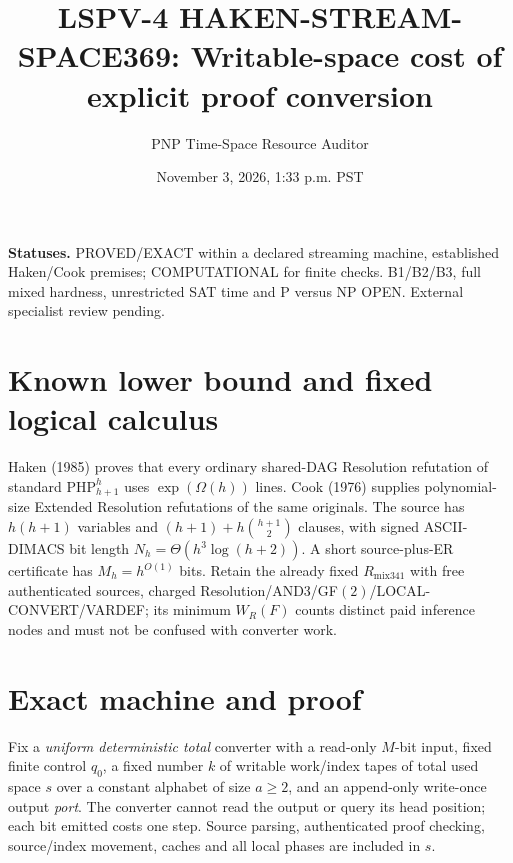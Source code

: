 \documentclass[11pt]{article}
\title{LSPV-4 HAKEN-STREAM-SPACE369: Writable-space cost of explicit proof conversion}
\author{PNP Time-Space Resource Auditor}
\date{November 3, 2026, 1:33 p.m. PST}
\begin{document}
\maketitle
\noindent\textbf{Statuses.} PROVED/EXACT within a declared streaming machine, established Haken/Cook premises; COMPUTATIONAL for finite checks. B1/B2/B3, full mixed hardness, unrestricted SAT time and P versus NP OPEN. External specialist review pending.

\section*{Known lower bound and fixed logical calculus}
Haken (1985) proves that every ordinary shared-DAG Resolution refutation of standard $\mathrm{PHP}_{h+1}^{h}$ uses $\exp(\Omega(h))$ lines. Cook (1976) supplies polynomial-size Extended Resolution refutations of the same originals. The source has $h(h+1)$ variables and $(h+1)+h\binom{h+1}{2}$ clauses, with signed ASCII-DIMACS bit length $N_h=\Theta(h^3\log(h+2))$. A short source-plus-ER certificate has $M_h=h^{O(1)}$ bits. Retain the already fixed $R_{\mathrm{mix341}}$ with free authenticated sources, charged Resolution/AND3/GF$(2)$/LOCAL-CONVERT/VARDEF; its minimum $W_R(F)$ counts distinct paid inference nodes and must not be confused with converter work.

\section*{Exact machine and proof}
Fix a \emph{uniform deterministic total} converter with a read-only $M$-bit input, fixed finite control $q_0$, a fixed number $k$ of writable work/index tapes of total used space $s$ over a constant alphabet of size $a\ge2$, and an append-only write-once output \emph{port}. The converter cannot read the output or query its head position; each bit emitted costs one step. Source parsing, authenticated proof checking, source/index movement, caches and all local phases are included in $s$.
\end{document}
